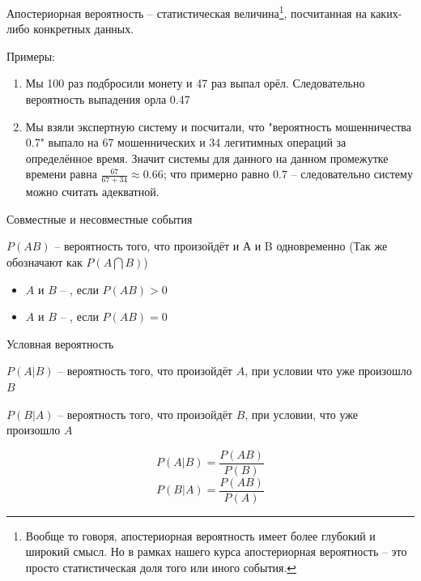 \begin{frame}{Апостериорная вероятность}
	\small
	 -- статистическая величина\footnote{
		Вообще то говоря, апостериорная вероятность имеет более глубокий и широкий смысл.
		Но в рамках нашего курса апостериорная вероятность -- это просто статистическая доля того или иного события.}, посчитанная на каких-либо конкретных данных.
	
	Примеры: 
	\footnotesize
	\begin{enumerate}
		\item Мы 100 раз подбросили монету и 47 раз выпал орёл. Следовательно 
		вероятность выпадения орла 0.47
		\item Мы взяли экспертную систему и посчитали, что  "вероятность мошенничества 0.7"
		выпало на 67 мошеннических и 34 легитимных операций за определённое время. 
		Значит  системы для данного  на данном промежутке времени равна $\frac{67}{67+34} \approx 0.66$; что примерно равно $0.7$ -- следовательно систему можно считать адекватной.
	\end{enumerate}
\end{frame}

\begin{frame}{Совместные и несовместные события}


$P(AB)$ -- вероятность того, что произойдёт и А и B одновременно
(Так же обозначают как $P(A\bigcap B)$)


\begin{itemize}
	\item $A$ и $B$ -- , если $P(AB) > 0$
	\item $A$ и $B$ -- , если $P(AB) = 0$
\end{itemize}



\end{frame}
\begin{frame}{Условная вероятность}

$P(A|B)$ -- вероятность того, что произойдёт $A$, при условии что уже произошло $B$

$P(B|A)$ -- вероятность того, что произойдёт $B$, при условии, что уже произошло $A$

\begin{equation}\label{eq:P_A_by_B}
P(A|B) = \frac{P(AB)}{P(B)}
\end{equation}
\begin{equation}\label{eq:P_B_by_A}
P(B|A) = \frac{P(AB)}{P(A)}
\end{equation}

	
\end{frame}


